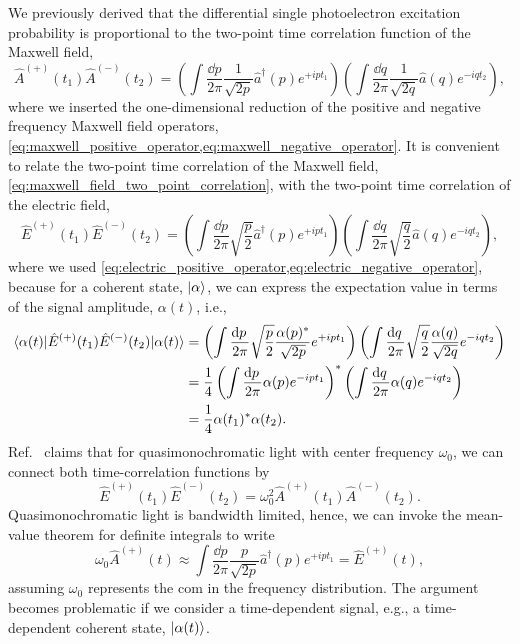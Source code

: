 We previously derived that the differential single photoelectron excitation probability is proportional to the two-point time correlation function of the Maxwell field,
\begin{equation}
	\hat{A}^{(+)}(t_1)
	\hat{A}^{(-)}(t_2)
	=
	\left(
		\int\frac{\dd{p}}{2\pi}
		\frac{1}{\sqrt{2p}}
		\hat{a}^\dagger(p)
		e^{+ipt_1}
	\right)
	\left(
		\int\frac{\dd{q}}{2\pi}
		\frac{1}{\sqrt{2q}}
		\hat{a}(q)
		e^{-iqt_2}
	\right)
	,
	\label{eq:maxwell_field_two_point_correlation}
\end{equation}
where we inserted the one-dimensional reduction of the positive and negative frequency Maxwell field operators, \cref{eq:maxwell_positive_operator,eq:maxwell_negative_operator}.
It is convenient to relate the two-point time correlation of the Maxwell field, \cref{eq:maxwell_field_two_point_correlation}, with the two-point time correlation of the electric field,
\begin{equation}
	\hat{E}^{(+)}(t_1)
	\hat{E}^{(-)}(t_2)
	=
	\left(
		\int\frac{\dd{p}}{2\pi}
		\sqrt{\frac{p}{2}}
		\hat{a}^\dagger(p)
		e^{+ipt_1}
	\right)
	\left(
		\int\frac{\dd{q}}{2\pi}
		\sqrt{\frac{q}{2}}
		\hat{a}(q)
		e^{-iqt_2}
	\right)
	,
	\label{eq:electric_field_two_point_correlation}
\end{equation}
where we used \cref{eq:electric_positive_operator,eq:electric_negative_operator}, because for a coherent state, $\lvert\alpha\rangle$, we can express the expectation value in terms of the signal amplitude, $\alpha(t)$, i.e.,
\begin{equation}
	\begin{split}
		\bra{\alpha(t)}
		\hat{E}^{(+)}(t_1)
		\hat{E}^{(-)}(t_2)
		\ket{\alpha(t)}
		&=
		\left(
			\int\frac{\dd{p}}{2\pi}
			\sqrt{\frac{p}{2}}
			\frac{\alpha(p)^*}{\sqrt{2p}}
			e^{+ipt_1}
		\right)
		\left(
			\int\frac{\dd{q}}{2\pi}
			\sqrt{\frac{q}{2}}
			\frac{\alpha(q)}{\sqrt{2q}}
			e^{-iqt_2}
		\right)
		\\
		&=
		\frac{1}{4}
		\left(
			\int\frac{\dd{p}}{2\pi}
			\alpha(p)
			e^{-ipt_1}
		\right)^*
		\left(
			\int\frac{\dd{q}}{2\pi}
			\alpha(q)
			e^{-iqt_2}
		\right)
		\\
		&=
		\frac{1}{4}
		\alpha(t_1)^*
		\alpha(t_2)
		.
	\end{split}
\end{equation}
Ref.~\cite{Kimble1984} claims that for quasimonochromatic light with center frequency $\omega_0$, we can connect both time-correlation functions by
\begin{equation}
	\hat{E}^{(+)}(t_1)
	\hat{E}^{(-)}(t_2)
	=
	\omega_0^2
	\hat{A}^{(+)}(t_1)
	\hat{A}^{(-)}(t_2)
	.
\end{equation}
Quasimonochromatic light is bandwidth limited, hence, we can invoke the mean-value theorem for definite integrals to write
\begin{equation}
	\omega_0
	\hat{A}^{(+)}(t)
	\approx
	\int\frac{\dd{p}}{2\pi}
	\frac{p}{\sqrt{2p}}
	\hat{a}^\dagger(p)
	e^{+ipt_1}
	=
	\hat{E}^{(+)}(t)
	,
\end{equation}
assuming $\omega_0$ represents the \gls{com} in the frequency distribution.
The argument becomes problematic if we consider a time-dependent signal, e.g., a time-dependent coherent state, $\lvert\alpha(t)\rangle$.

